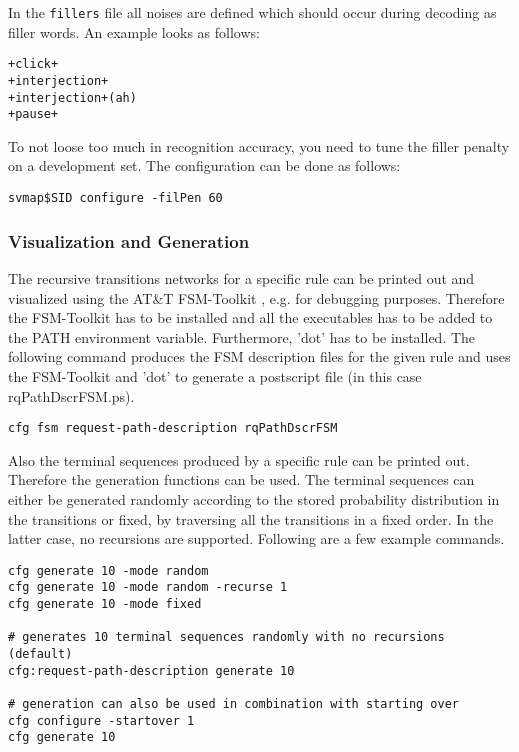 In the \texttt{fillers} file all noises are defined which should occur
during decoding as filler words. An example looks as follows:

\begin{verbatim}
+click+
+interjection+
+interjection+(ah)
+pause+
\end{verbatim}

To not loose too much in recognition accuracy, you need to tune the
filler penalty on a development set.  The configuration can be done as
follows:

\begin{verbatim}
svmap$SID configure -filPen 60
\end{verbatim}


\subsubsection{Visualization and Generation}

The recursive transitions networks for a specific rule can be printed
out and visualized using the AT\&T FSM-Toolkit \cite{fsm}, e.g. for
debugging purposes. Therefore the FSM-Toolkit has to be installed and
all the executables has to be added to the PATH environment variable.
Furthermore, 'dot' has to be installed. The following command produces
the FSM description files for the given rule and uses the FSM-Toolkit
and 'dot' to generate a postscript file (in this case
rqPathDscrFSM.ps).

\begin{verbatim}
cfg fsm request-path-description rqPathDscrFSM
\end{verbatim}

Also the terminal sequences produced by a specific rule can be printed
out. Therefore the generation functions can be used. The terminal
sequences can either be generated randomly according to the stored
probability distribution in the transitions or fixed, by traversing
all the transitions in a fixed order. In the latter case, no
recursions are supported. Following are a few example commands.

\begin{verbatim}
cfg generate 10 -mode random
cfg generate 10 -mode random -recurse 1
cfg generate 10 -mode fixed

# generates 10 terminal sequences randomly with no recursions (default)
cfg:request-path-description generate 10

# generation can also be used in combination with starting over
cfg configure -startover 1
cfg generate 10
\end{verbatim}


